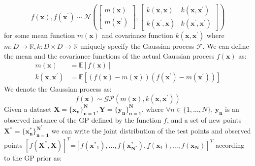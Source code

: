 \begin{equation}\label{GPDef}
    f(\mathbf{x}), f\left(\mathbf{x}^{\prime}\right) \sim \mathcal{N}\left(\left[\begin{array}{c}
    m(\mathbf{x})  \tag{1}\\
    m\left(\mathbf{x}^{\prime}\right)
    \end{array}\right],\left[\begin{array}{cc}
    k(\mathbf{x}, \mathbf{x}) & k\left(\mathbf{x}, \mathbf{x}^{\prime}\right) \\
    k\left(\mathbf{x}^{\prime}, \mathbf{x}\right) & k\left(\mathbf{x}^{\prime}, \mathbf{x}^{\prime}\right)
    \end{array}\right]\right)
\end{equation}
for some mean function $m(\mathbf{x})$ and covariance function $k\left(\mathbf{x}, \mathbf{x}^{\prime}\right)$ where $m: D \rightarrow \mathbb{R}, k: D \times D \rightarrow \mathbb{R}$ uniquely specify the Gaussian process $\mathcal{F}$. We can define the mean and the covariance functions of the actual Gaussian process $f(\mathbf{x})$ as:
\begin{align}\label{GPFunc}
    m(\mathbf{x}) & =\mathbb{E}[f(\mathbf{x})]  \\
    k\left(\mathbf{x}, \mathbf{x}^{\prime}\right) & =\mathbb{E}\left[(f(\mathbf{x})-m(\mathbf{x}))\left(f\left(\mathbf{x}^{\prime}\right)-m\left(\mathbf{x}^{\prime}\right)\right)\right]
\end{align}
We denote the Gaussian process as:
\begin{equation}\label{GPForm}
f(\mathbf{x}) \sim \mathcal{G} \mathcal{P}\left(m(\mathbf{x}), k\left(\mathbf{x}, \mathbf{x}^{\prime}\right)\right)
\end{equation}
Given a dataset $\mathbf{X=\{x_n\}_{n=1}^N, Y=\{y_n\}_{n=1}^N}$, where $\forall n \in \{1, \ldots, N\}$, $\mathbf{y_n}$ is an observed instance of the GP defined by the function $f$, and a set of new points $\mathbf{X^*=\{x^*_n\}_{n=1}^{N^*}}$ we can write the joint distribution of the test points and observed points $\left[f(\mathbf{X^*, X})\right]^T$=$\left[f\left(\mathbf{x^*}_{1}\right), \ldots, f\left(\mathbf{x^*_{N^*}}\right), f\left(\mathbf{x}_{1}\right), \ldots, f\left(\mathbf{x_{N}}\right)\right]^T$ according to the GP prior as:
